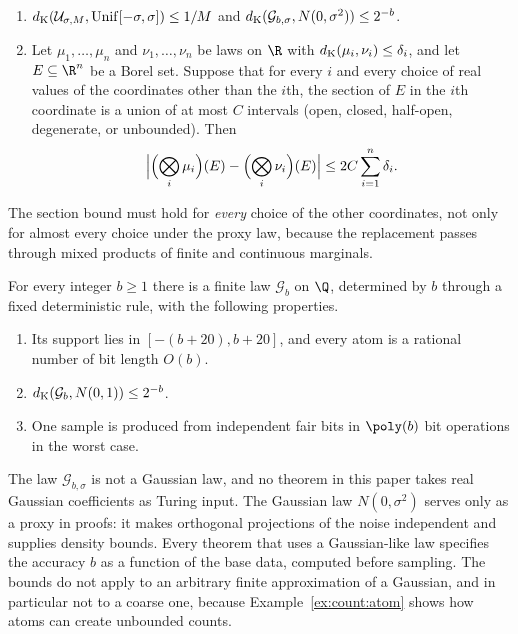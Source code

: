 \begin{lemma}\label{lem:count:transfer}
\begin{enumerate}[label=(\alph*)]
\item $d_{\rm K}(\mathcal U_{\sigma,M},\mathrm{Unif}[-\sigma,\sigma])\le1/M$
 and $d_{\rm K}(\mathcal G_{b,\sigma},N(0,\sigma^2))\le2^{-b}$.
\item Let $\mu_1,\dots,\mu_n$ and $\nu_1,\dots,\nu_n$ be laws on $\R$ with
 $d_{\rm K}(\mu_i,\nu_i)\le\delta_i$, and let $E\subseteq\R^n$ be a Borel
 set. Suppose that for every $i$ and every choice of real values of the
 coordinates other than the $i$th, the section of $E$ in the $i$th coordinate
 is a union of at most $C$ intervals (open, closed, half-open, degenerate, or
 unbounded). Then
 \[
  \Bigl|\Bigl(\bigotimes_i\mu_i\Bigr)(E)-\Bigl(\bigotimes_i\nu_i\Bigr)(E)\Bigr|
  \le2C\sum_{i=1}^n\delta_i .
 \]
\end{enumerate}
\end{lemma}

The section bound must hold for \emph{every} choice of the other
coordinates, not only for almost every choice under the proxy law, because
the replacement passes through mixed products of finite and continuous
marginals.

\begin{lemma}\label{lem:count:gauss-sampler}
For every integer $b\ge1$ there is a finite law $\mathcal G_b$ on $\Q$,
determined by $b$ through a fixed deterministic rule, with the following
properties.
\begin{enumerate}[label=(\alph*)]
\item Its support lies in $[-(b+20),b+20]$, and every atom is a rational
 number of bit length $O(b)$.
\item $d_{\rm K}(\mathcal G_b,N(0,1))\le2^{-b}$.
\item One sample is produced from independent fair bits in $\poly(b)$ bit
 operations in the worst case.
\end{enumerate}
\end{lemma}

The law $\mathcal G_{b,\sigma}$ is not a Gaussian law, and no theorem in this
paper takes real Gaussian coefficients as Turing input. The Gaussian law
$N(0,\sigma^2)$ serves only as a proxy in proofs: it makes orthogonal
projections of the noise independent and supplies density bounds. Every
theorem that uses a Gaussian-like law specifies the accuracy $b$ as a
function of the base data, computed before sampling. The bounds do not
apply to an arbitrary finite approximation of a Gaussian, and in particular
not to a coarse one, because Example~\ref{ex:count:atom} shows how atoms can
create unbounded counts.

